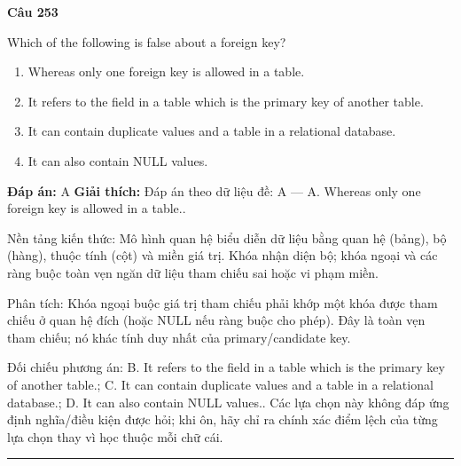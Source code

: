 \documentclass[11pt,a4paper]{article}
\newenvironment{question}[1]{%
  \par\vspace{1em}\noindent\textbf{\large Câu #1}\par\vspace{0.4em}
}{%
  \par\vspace{1em}\hrule\vspace{0.6em}
}
\newenvironment{choices}{%
  \begin{enumerate}[label=\textbf{\Alph*.},leftmargin=2.2em,itemsep=2pt,topsep=3pt]
}{%
  \end{enumerate}
}
\newcommand{\choice}{\item}
\begin{document}
\begin{question}{253}
Which of the following is false about a foreign key?
\begin{choices}
\choice Whereas only one foreign key is allowed in a table.
\choice It refers to the field in a table which is the primary key of another table.
\choice It can contain duplicate values and a table in a relational database.
\choice It can also contain NULL values.
\end{choices}
\textbf{Đáp án:} A
\textbf{Giải thích:} Đáp án theo dữ liệu đề: A — A. Whereas only one foreign key is allowed in a table..

Nền tảng kiến thức: Mô hình quan hệ biểu diễn dữ liệu bằng quan hệ (bảng), bộ (hàng), thuộc tính (cột) và miền giá trị. Khóa nhận diện bộ; khóa ngoại và các ràng buộc toàn vẹn ngăn dữ liệu tham chiếu sai hoặc vi phạm miền.

Phân tích: Khóa ngoại buộc giá trị tham chiếu phải khớp một khóa được tham chiếu ở quan hệ đích (hoặc NULL nếu ràng buộc cho phép). Đây là toàn vẹn tham chiếu; nó khác tính duy nhất của primary/candidate key.

Đối chiếu phương án: B. It refers to the field in a table which is the primary key of another table.; C. It can contain duplicate values and a table in a relational database.; D. It can also contain NULL values.. Các lựa chọn này không đáp ứng định nghĩa/điều kiện được hỏi; khi ôn, hãy chỉ ra chính xác điểm lệch của từng lựa chọn thay vì học thuộc mỗi chữ cái.
\end{question}
\end{document}
